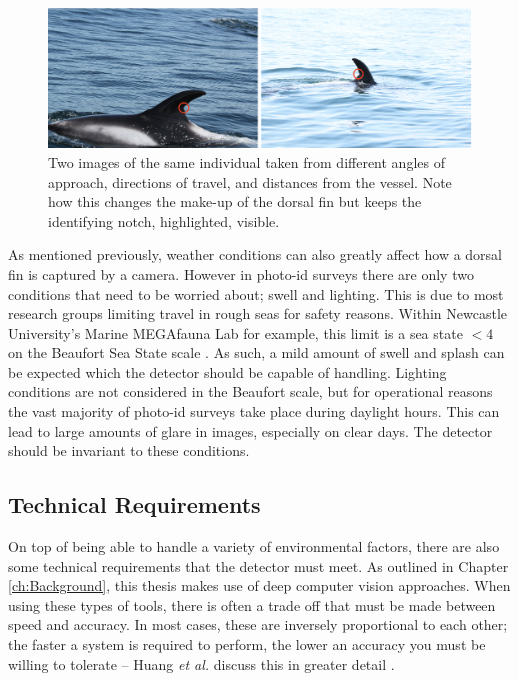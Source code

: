    \begin{figure}
 	\begin{center}
 		\includegraphics[scale=0.6]{Chapter4/figs/angle-size-example.png}
 	\end{center}
 	\caption[Two images of the same individual taken from different angles of approach, directions of travel, and distances from the vessel.]{Two images of the same individual taken from different angles of approach, directions of travel, and distances from the vessel. Note how this changes the make-up of the dorsal fin but keeps the identifying notch, highlighted, visible. 
 	}
 	\label{fig:angle-eg}
 \end{figure}
 
 As mentioned previously, weather conditions can also greatly affect how a dorsal fin is captured by a camera. However in photo-id surveys there are only two conditions that need to be worried about; swell and lighting. This is due to most research groups limiting travel in rough seas for safety reasons. Within Newcastle University's Marine MEGAfauna Lab for example, this limit is a sea state $<4$ on the Beaufort Sea State scale \cite{world_meteorologicial_society_beaufort_1970}. As such, a mild amount of swell and splash can be expected which the detector should be capable of handling. Lighting conditions are not considered in the Beaufort scale, but for operational reasons the vast majority of photo-id surveys take place during daylight hours. This can lead to large amounts of glare in images, especially on clear days. The detector should be invariant to these conditions. 
 
 \subsection{Technical Requirements}\label{ch:cetDet,sec:requirements,sub:technical}
 
On top of being able to handle a variety of environmental factors, there are also some technical requirements that the detector must meet. As outlined in Chapter \ref{ch:Background}, this thesis makes use of deep computer vision approaches. When using these types of tools, there is often a trade off that must be made between speed and accuracy. In most cases, these are inversely proportional to each other; the faster a system is required to perform, the lower an accuracy you must be willing to tolerate -- Huang \textit{et al.} discuss this in greater detail \cite{huang_speedaccuracy_2017}.
 
